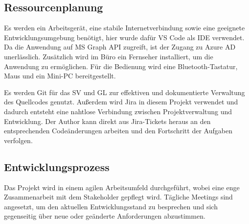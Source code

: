 \subsection{Ressourcenplanung}
\label{sec:Ressourcenplanung}

Es werden ein Arbeitsgerät, eine stabile Internetverbindung sowie eine geeignete Entwicklungsumgebung benötigt, hier wurde dafür \ac{VS} Code als \ac{IDE} verwendet.
Da die Anwendung auf \ac{MS} Graph \ac{API} zugreift, ist der Zugang zu Azure \ac{AD} unerlässlich.
Zusätzlich wird im Büro ein Fernseher installiert, um die Anwendung zu ermöglichen.
Für die Bedienung wird eine Bluetooth-Tastatur, Maus und ein Mini-PC bereitgestellt.

Es werden Git für das \ac{SV} und \ac{GL} zur effektiven und dokumentierte Verwaltung des Quellcodes genutzt.
Außerdem wird Jira in diesem Projekt verwendet und dadurch entsteht eine nahtlose Verbindung zwischen Projektverwaltung und Entwicklung.
Der Author kann direkt aus Jira-Tickets heraus an den entsprechenden Codeänderungen arbeiten und den Fortschritt der Aufgaben verfolgen.


\subsection{Entwicklungsprozess}
\label{sec:Entwicklungsprozess}
Das Projekt wird in einem agilen Arbeitsumfeld durchgeführt, wobei eine enge Zusammenarbeit mit dem Stakeholder gepflegt wird.
Tägliche Meetings sind angesetzt, um den aktuellen Entwicklungsstand zu besprechen und sich gegenseitig über neue oder geänderte Anforderungen abzustimmen.